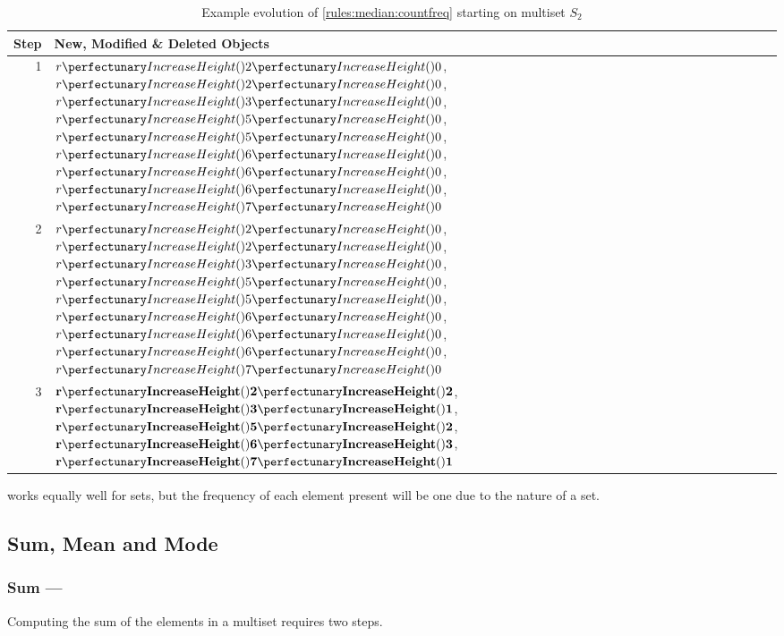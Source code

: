 \begin{table}[htbp]
\centering
   \begin{tabular}{|r|l|}
    \hline
    \textbf{Step} & \textbf{New, Modified \& Deleted Objects} \\ \hline
    1 & \(\cpfuncn{r}{2}{0}\), \(\cpfuncn{r}{2}{0}\), \(\cpfuncn{r}{3}{0}\), \(\cpfuncn{r}{5}{0}\), \(\cpfuncn{r}{5}{0}\), \(\cpfuncn{r}{6}{0}\), \(\cpfuncn{r}{6}{0}\), \(\cpfuncn{r}{6}{0}\), \(\cpfuncn{r}{7}{0}\)\\ \hline
    
    2 & \(\cpfuncn{r}{2}{0}\), \sout{\(\cpfuncn{r}{2}{0}\)}, \(\cpfuncn{r}{3}{0}\), \(\cpfuncn{r}{5}{0}\), \sout{\(\cpfuncn{r}{5}{0}\)}, \(\cpfuncn{r}{6}{0}\), \sout{\(\cpfuncn{r}{6}{0}\)}, \sout{\(\cpfuncn{r}{6}{0}\)}, \(\cpfuncn{r}{7}{0}\)\\ \hline
    
    3 & \(\mathbf{\cpfuncn{r}{2}{2}}\), \(\mathbf{\cpfuncn{r}{3}{1}}\), \(\mathbf{\cpfuncn{r}{5}{2}}\), \(\mathbf{\cpfuncn{r}{6}{3}}\), \(\mathbf{\cpfuncn{r}{7}{1}}\)\\ \hline
\end{tabular}
\caption[Example evolution of \cref{rules:median:countfreq} to count the occurrence frequency of elements in a multiset]{\label{tab:median:countfreq}Example evolution of \cref{rules:median:countfreq} starting on multiset \(S_2\)}
\end{table}

 works equally well for sets, but the frequency of each element present will be one due to the nature of a set.

\subsection{Sum, Mean and Mode}\label{sec:median:sumeanmode}

\subsubsection{Sum --- }\label{sec:median:sum}

\begin{proposition}\label{prop:median:sum}
Computing the sum of the elements in a multiset requires two steps.
\end{proposition}

